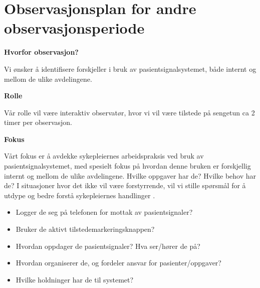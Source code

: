 \chapter{Observasjonsplan for andre observasjonsperiode}
\label{chp:appendix_observasjonsplan2}

\textbf{Hvorfor observasjon?}

\noindent
Vi ønsker å identifisere forskjeller i bruk av pasientsignalsystemet, både internt og mellom de ulike avdelingene.

\noindent
\textbf{Rolle}

\noindent
Vår rolle vil være interaktiv observatør, hvor vi vil være tilstede på sengetun ca 2 timer per observasjon.

\noindent
\textbf{Fokus}

\noindent
Vårt fokus er å avdekke sykepleiernes arbeidspraksis ved bruk av pasientsignalsystemet, med spesielt fokus på hvordan denne bruken er forskjellig internt og mellom de ulike avdelingene. Hvilke oppgaver har de? Hvilke behov har de? I situasjoner hvor det ikke vil være forstyrrende, vil vi stille spørsmål for å utdype og  bedre forstå sykepleiernes handlinger .

\begin{itemize}
	\item Logger de seg på telefonen for mottak av pasientsignaler?
	\item Bruker de aktivt tilstedemarkeringsknappen?
	\item Hvordan oppdager de pasientsignaler? Hva ser/hører de på?
	\item Hvordan organiserer de, og fordeler ansvar for pasienter/oppgaver?
	\item Hvilke holdninger har de til systemet?
\end{itemize}